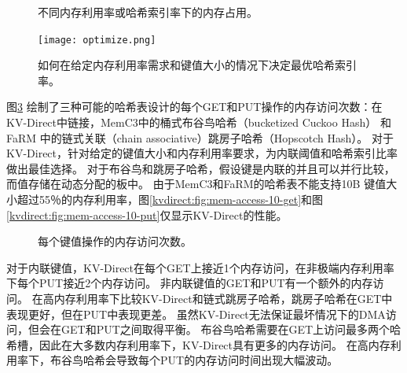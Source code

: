 \begin{figure}[htbp]
	\caption{不同内存利用率或哈希索引率下的内存占用。}
	\label{kvdirect:fig:memory-access-count}
\end{figure}

\begin{figure}[htbp]
	\centering
	\texttt{[image: optimize.png]}
	\caption{如何在给定内存利用率需求和键值大小的情况下决定最优哈希索引率。}
	\label{kvdirect:fig:hashline-ratio}
\end{figure}

图\ref {kvdirect:fig:mem-access-tput} 绘制了三种可能的哈希表设计的每个GET和PUT操作的内存访问次数：在KV-Direct中链接，MemC3中的桶式布谷鸟哈希（bucketized Cuckoo Hash）\cite {fan2013memc3} 和FaRM \cite {dragojevic2014farm} 中的链式关联（chain associative）跳房子哈希（Hopscotch Hash）。
对于KV-Direct，针对给定的键值大小和内存利用率要求，为内联阈值和哈希索引比率做出最佳选择。
对于布谷鸟和跳房子哈希，假设键是内联的并且可以并行比较，而值存储在动态分配的板中。
由于MemC3和FaRM的哈希表不能支持10B 键值大小超过55％的内存利用率，图\ref {kvdirect:fig:mem-access-10-get}和图\ref {kvdirect:fig:mem-access-10-put}仅显示KV-Direct的性能。


\begin{figure}[htbp]
	\centering
	
	\vfill
	
	\caption{每个键值操作的内存访问次数。}
	\label{kvdirect:fig:mem-access-tput}
\end{figure}


对于内联键值，KV-Direct在每个GET上接近1个内存访问，在非极端内存利用率下每个PUT接近2个内存访问。
非内联键值的GET和PUT有一个额外的内存访问。
在高内存利用率下比较KV-Direct和链式跳房子哈希，跳房子哈希在GET中表现更好，但在PUT中表现更差。
虽然KV-Direct无法保证最坏情况下的DMA访问，但会在GET和PUT之间取得平衡。
布谷鸟哈希需要在GET上访问最多两个哈希槽，因此在大多数内存利用率下，KV-Direct具有更多的内存访问。
在高内存利用率下，布谷鸟哈希会导致每个PUT的内存访问时间出现大幅波动。



